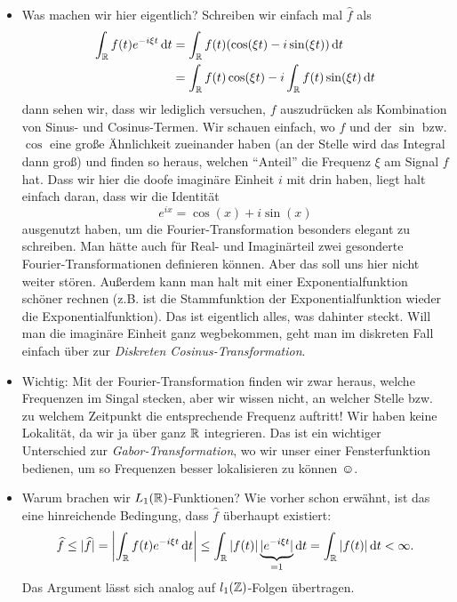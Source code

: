 \begin{remark}\leavevmode
\begin{itemize}
\item Was machen wir hier eigentlich? Schreiben wir einfach mal $ \widehat{f} $ als
\begin{align*}
   \int_{\R} f(t) e^{-i\xi t} \dif t
&= \int_{\R} f(t) (\cos(\xi t) - i\sin(\xi t)) \dif t \\
&= \int_{\R} f(t) \cos(\xi t) - i \int_{\R} f(t) \sin(\xi t) \dif t
\end{align*}
dann sehen wir, dass wir lediglich versuchen, $ f $ auszudrücken als Kombination von Sinus- und
Cosinus-Termen. Wir schauen einfach, wo $ f $ und der $ \sin $ bzw. $ \cos $ eine große Ähnlichkeit
zueinander haben (an der Stelle wird das Integral dann groß) und finden so heraus, welchen 
\enquote{Anteil} die Frequenz $ \xi $ am Signal $ f $ hat. Dass wir hier die doofe imaginäre 
Einheit $ i $ mit drin haben, liegt halt einfach daran, dass wir die Identität
\[
  e^{ix} = \cos(x) + i \sin(x)
\]
ausgenutzt haben, um die Fourier-Transformation besonders elegant zu schreiben. Man hätte auch für
Real- und Imaginärteil zwei gesonderte Fourier-Transformationen definieren können. Aber das soll uns
hier nicht weiter stören. Außerdem kann man halt mit einer Exponentialfunktion schöner rechnen 
(z.B. ist die Stammfunktion der Exponentialfunktion wieder die Exponentialfunktion). Das ist 
eigentlich alles, was dahinter steckt. Will man die imaginäre Einheit ganz wegbekommen, geht man 
im diskreten Fall einfach über zur \emph{Diskreten Cosinus-Transformation}.
\item Wichtig: Mit der Fourier-Transformation finden wir zwar heraus, welche Frequenzen im Singal 
stecken,
aber wir wissen nicht, an welcher Stelle bzw. zu welchem Zeitpunkt die entsprechende Frequenz 
auftritt! Wir haben keine Lokalität, da wir ja über ganz $ \mathbb{R} $ integrieren. Das ist ein wichtiger 
Unterschied zur \emph{Gabor-Transformation}, wo wir unser einer Fensterfunktion bedienen, um so 
Frequenzen besser lokalisieren zu können $ \smiley $.
\item Warum brachen wir $ L_{1}(\mathbb{R}) $-Funktionen? Wie vorher schon erwähnt, ist das eine 
hinreichende Bedingung, dass $ \widehat{f} $ überhaupt existiert:
\[
  \widehat{f} \leq |\widehat{f}| = \left| \int_{\R} f(t) e^{-i\xi t} \dif t \right|
  \leq \int_{\R} |f(t)| \underbrace{|e^{-i\xi t}|}_{= 1} \dif t = \int_{\R} |f(t)| \dif t < \infty.
\]
Das Argument lässt sich analog auf $ l_{1}(\mathbb{Z}) $-Folgen übertragen.
\end{itemize}
\end{remark}

